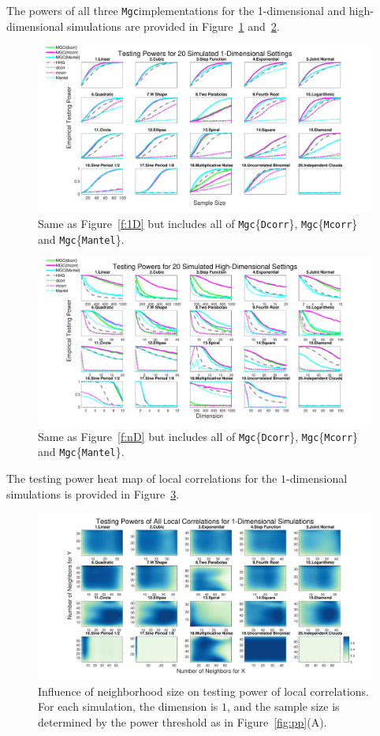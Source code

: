 \documentclass[11pt]{article}
\providecommand{\sct}[1]{{\sc \texttt{#1}}}
\newcommand{\Mgc}{\sct{Mgc}}
\newcommand{\Dcorr}{\sct{Dcorr}}
\newcommand{\Mcorr}{\sct{Mcorr}}
\newcommand{\Mantel}{\sct{Mantel}}
\begin{document}
The powers of all three \Mgc implementations for the 1-dimensional and high-dimensional simulations are provided in Figure~\ref{f:1DAll} and~\ref{f:nDAll}.
\begin{figure}[htbp]
\includegraphics[width=1.0\textwidth]{Figures/Fig1DPowerAll}
\caption{
Same as Figure~\ref{f:1D} but includes all of \Mgc\{\Dcorr\}, \Mgc\{\Mcorr\} and \Mgc\{\Mantel\}.}
\label{f:1DAll}
\end{figure}

\begin{figure}[htbp]
\includegraphics[width=1.0\textwidth]{Figures/FigHDPowerAll}
\caption{
Same as Figure~\ref{f:nD} but includes all of \Mgc\{\Dcorr\}, \Mgc\{\Mcorr\} and \Mgc\{\Mantel\}.}
\label{f:nDAll}
\end{figure}

The testing power heat map of local correlations for the $1$-dimensional simulations is provided in Figure~\ref{f:powermaps1}.
\begin{figure}[htbp]
\includegraphics[width=1.0\textwidth]{Figures/Fig1DHeat}
\caption{Influence of neighborhood size on testing power of local correlations. For each simulation, the dimension is $1$, and the sample size is determined by the power threshold as in Figure~\ref{fig:pp}(A).
}
\label{f:powermaps1}
\end{figure}
\end{document}
